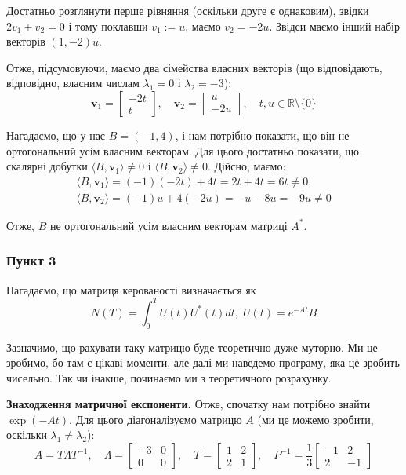 \documentclass{hw_template}
\begin{document}
Достатньо розглянути перше рівняння (оскільки друге є однаковим), звідки $2v_1+v_2=0$ і тому поклавши $v_1 := u$, маємо $v_2=-2u$. Звідси маємо інший набір векторів $(1,-2)u$. 

Отже, підсумовуючи, маємо два сімейства власних векторів (що відповідають, відповідно, власним числам $\lambda_1=0$ і $\lambda_2=-3$):
\begin{equation*}
    \mathbf{v}_1 = \begin{bmatrix}
        -2t \\ t
    \end{bmatrix}, \quad
    \mathbf{v}_2 = \begin{bmatrix}
        u \\ -2u
    \end{bmatrix}, \quad t,u \in \mathbb{R} \setminus \{0\}
\end{equation*}

Нагадаємо, що у нас $B=(-1,4)$, і нам потрібно показати, що він не ортогональний усім власним векторам. Для цього достатньо показати, що скалярні добутки $\langle B, \mathbf{v}_1 \rangle \neq 0$ і $\langle B, \mathbf{v}_2 \rangle \neq 0$. Дійсно, маємо:
\begin{gather*}
    \langle B, \mathbf{v}_1 \rangle = (-1)(-2t) + 4t = 2t+4t = 6t \neq 0, \\
    \langle B, \mathbf{v}_2 \rangle = (-1)u + 4(-2u) = -u-8u = -9u \neq 0
\end{gather*}

Отже, $B$ не ортогональний усім власним векторам матриці $A^*$.

\subsubsection*{Пункт 3}

Нагадаємо, що матриця керованості визначається як
\begin{equation*}
    N(T) = \int_0^T U(t)U^*(t)dt, \; U(t) = e^{-At}B
\end{equation*}

Зазначимо, що рахувати таку матрицю буде теоретично дуже муторно. Ми це зробимо, бо там є цікаві моменти, але далі ми наведемо програму, яка це зробить чисельно. Так чи інакше, починаємо ми з теоретичного розрахунку.

\textbf{Знаходження матричної експоненти.} Отже, спочатку нам потрібно знайти $\exp(-At)$. Для цього діагоналізуємо матрицю $A$ (ми це можемо зробити, оскільки $\lambda_1 \neq \lambda_2$):
\begin{equation*}
    A = T\Lambda T^{-1}, \quad \Lambda = \begin{bmatrix}
        -3 & 0 \\
        0 & 0
    \end{bmatrix}, \quad T = \begin{bmatrix}
        1 & 2 \\
        2 & 1
    \end{bmatrix}, \quad P^{-1} = \frac{1}{3}\begin{bmatrix}
        -1 & 2 \\
        2 & -1
    \end{bmatrix}
\end{equation*}
\end{document}
